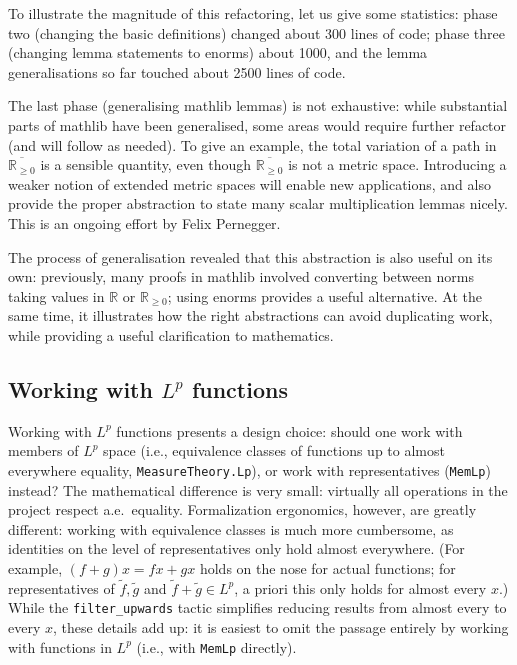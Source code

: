 \documentclass[12pt]{amsart}
\newcommand{\lean}[1]{\texttt{#1}}
\newcommand*{\real}{\mathbb{R}} %
\newcommand{\nnreal}{\real_{\ge0}}
\newcommand{\ennreal}{\overline{\real_{\ge0}}}
\begin{document}
To illustrate the magnitude of this refactoring, let us give some statistics: phase two (changing the basic definitions) changed about 300 lines of code; phase three (changing lemma statements to enorms) about 1000, and the lemma generalisations so far touched about 2500 lines of code.

The last phase (generalising mathlib lemmas) is not exhaustive: while substantial parts of mathlib have been generalised, some areas would require further refactor (and will follow as needed). To give an example, the total variation of a path in $\ennreal$ is a sensible quantity, even though $\ennreal$ is not a metric space. Introducing a weaker notion of extended metric spaces will enable new applications, and also provide the proper abstraction to state many scalar multiplication lemmas nicely. This is an ongoing effort by Felix Pernegger.

The process of generalisation revealed that this abstraction is also useful on its own: previously, many proofs in mathlib involved converting between norms taking values in $\real$ or $\nnreal$; using enorms provides a useful alternative. At the same time, it illustrates how the right abstractions can avoid duplicating work, while providing a useful clarification to mathematics.

\subsection{Working with $L^p$ functions}\label{subsec:Lp}

Working with $L^p$ functions presents a design choice: should one work with members of $L^p$ space (i.e., equivalence classes of functions up to almost everywhere equality, \lean{MeasureTheory.Lp}), or work with representatives (\lean{MemLp}) instead?
The mathematical difference is very small: virtually all operations in the project respect a.e.\ equality.
Formalization ergonomics, however, are greatly different: working with equivalence classes is much more cumbersome, as identities on the level of representatives only hold almost everywhere.
(For example, $(f+g)x = f x + g x$ holds on the nose for actual functions; for representatives of $\tilde{f},\tilde{g}$ and $\tilde{f}+\tilde{g}\in L^p$, a priori this only holds for almost every $x$.)
While the \lean{filter_upwards} tactic simplifies reducing results from almost every to every $x$, these details add up: it is easiest to omit the passage entirely by working with functions in $L^p$ (i.e., with \lean{MemLp} directly).
\end{document}
